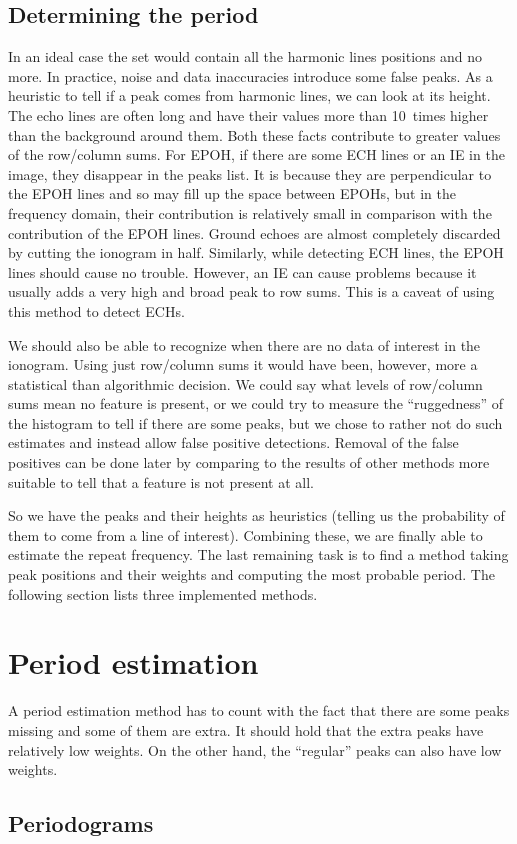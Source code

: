 \subsection{Determining the period}
In an ideal case the set would contain all the harmonic lines positions and no more. In practice, noise and data inaccuracies introduce some false peaks. As a heuristic to tell if a peak comes from harmonic lines, we can look at its height. The echo lines are often long and have their values more than 10~times higher than the background around them. Both these facts contribute to greater values of the row/column sums. For EPOH, if there are some ECH lines or an IE in the image, they disappear in the peaks list. It is because they are perpendicular to the EPOH lines and so may fill up the space between EPOHs, but in the frequency domain, their contribution is relatively small in comparison with the contribution of the EPOH lines. Ground echoes are almost completely discarded by cutting the ionogram in half. Similarly, while detecting ECH lines, the EPOH lines should cause no trouble. However, an IE can cause problems because it usually adds a very high and broad peak to row sums. This is a caveat of using this method to detect ECHs.

We should also be able to recognize when there are no data of interest in the ionogram. Using just row/column sums it would have been, however, more a statistical than algorithmic decision. We could say what levels of row/column sums mean no feature is present, or we could try to measure the ``ruggedness'' of the histogram to tell if there are some peaks, but we chose to rather not do such estimates and instead allow false positive detections. Removal of the false positives can be done later by comparing to the results of other methods more suitable to tell that a feature is not present at all. 

So we have the peaks and their heights as heuristics (telling us the probability of them to come from a line of interest). Combining these, we are finally able to estimate the repeat frequency. The last remaining task is to find a method taking peak positions and their weights and computing the most probable period. The following section lists three implemented methods.

\section{Period estimation}
A period estimation method has to count with the fact that there are some peaks missing and some of them are extra. It should hold that the extra peaks have relatively low weights. On the other hand, the ``regular'' peaks can also have low weights.

\subsection{Periodograms}














